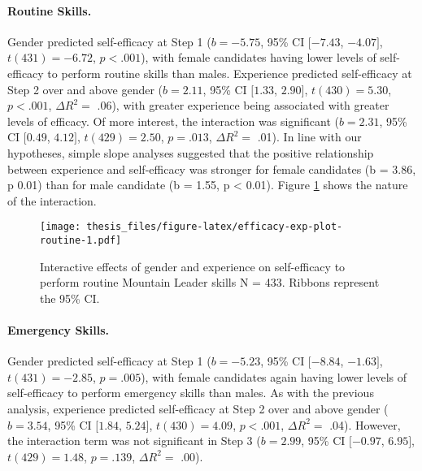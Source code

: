 \documentclass[
  12pt,
  a4paper,
]{book}
\begin{document}
\hypertarget{routine-skills.}{%
\paragraph{Routine Skills.}\label{routine-skills.}}

Gender predicted self-efficacy at Step 1 (\(b = -5.75\), 95\% CI \([-7.43\), \(-4.07]\), \(t(431) = -6.72\), \(p < .001\)), with female candidates having lower levels of self-efficacy to perform routine skills than males. Experience predicted self-efficacy at Step 2 over and above gender (\(b = 2.11\), 95\% CI \([1.33\), \(2.90]\), \(t(430) = 5.30\), \(p < .001\), \(\Delta R^2=\) .06), with greater experience being associated with greater levels of efficacy. Of more interest, the interaction was significant (\(b = 2.31\), 95\% CI \([0.49\), \(4.12]\), \(t(429) = 2.50\), \(p = .013\), \(\Delta R^2=\) .01). In line with our hypotheses, simple slope analyses suggested that the positive relationship between experience and self-efficacy was stronger for female candidates (b = 3.86, p 0.01) than for male candidate (b = 1.55, p \textless{} 0.01). Figure \ref{fig:efficacy-exp-plot-routine} shows the nature of the interaction.

\begin{figure}
\centering
\texttt{[image: thesis\_files/figure-latex/efficacy-exp-plot-routine-1.pdf]}
\caption{\label{fig:efficacy-exp-plot-routine}Interactive effects of gender and experience on self-efficacy to perform routine Mountain Leader skills N = 433. Ribbons represent the 95\% CI.}
\end{figure}

\hypertarget{emergency-skills.}{%
\paragraph{Emergency Skills.}\label{emergency-skills.}}

Gender predicted self-efficacy at Step 1 (\(b = -5.23\), 95\% CI \([-8.84\), \(-1.63]\), \(t(431) = -2.85\), \(p = .005\)), with female candidates again having lower levels of self-efficacy to perform emergency skills than males. As with the previous analysis, experience predicted self-efficacy at Step 2 over and above gender (\(b = 3.54\), 95\% CI \([1.84\), \(5.24]\), \(t(430) = 4.09\), \(p < .001\), \(\Delta R^2=\) .04). However, the interaction term was not significant in Step 3 (\(b = 2.99\), 95\% CI \([-0.97\), \(6.95]\), \(t(429) = 1.48\), \(p = .139\), \(\Delta R^2=\) .00).
\end{document}
